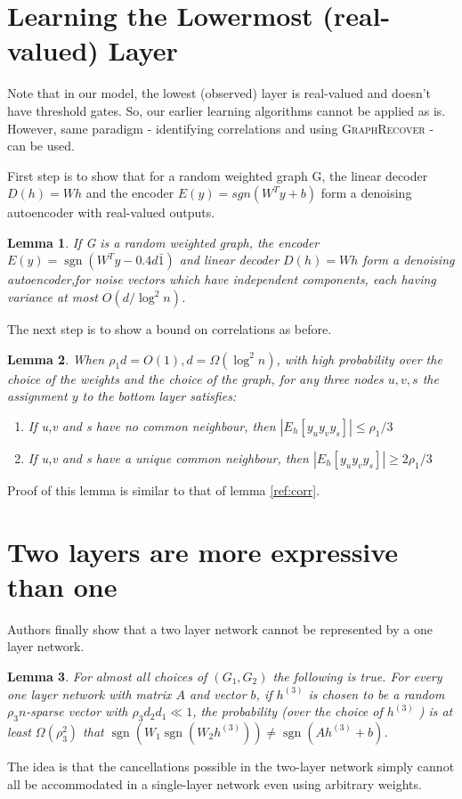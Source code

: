 \documentclass[11pt]{article}
\newcommand{\sgn}{\operatorname{sgn}}
\newtheorem{lemma}{Lemma}
\begin{document}
	\section{Learning the Lowermost (real-valued) Layer}
	Note that in our model, the lowest (observed) layer is real-valued and doesn't have threshold gates. So, our earlier learning algorithms cannot be applied as is. However, same paradigm - identifying correlations and using \textsc{GraphRecover} - can be used.
	
	First step is to show that for a random weighted graph G, the linear decoder $D(h) = Wh$ and the encoder $E(y) = sgn(W^T y + b)$ form a denoising autoencoder with real-valued outputs. 
	\begin{lemma}
	If G is a random weighted graph, the encoder $E(y)=\sgn(W^Ty - 0.4 d \bar{1})$ and linear decoder $D(h)= Wh$ form a denoising autoencoder,for noise vectors which have independent components, each having variance at most $O(d/ \log^2 n)$.
	\end{lemma}

	The next step is to show a bound on correlations as before.	
	\begin{lemma}
		When $\rho_1d = O(1), d = \Omega(\log^2 n)$, with high probability over the choice of the weights and the choice of the graph, for any three nodes $u, v, s$ the assignment $y$ to the bottom layer satisfies:
		\begin{enumerate}
		\item If u,v and s have no common neighbour, then $|E_h[y_uy_vy_s]| \leq \rho_1/3$
		\item If u,v and s have a unique common neighbour, then $|E_h[y_uy_vy_s]| \geq 2\rho_1/3$
		\end{enumerate}
	\end{lemma}
	Proof of this lemma is similar to that of lemma \ref{ref:corr}.
	\section{Two layers are more expressive than one}
	Authors finally show that a two layer network cannot be represented by a one layer network.
	\begin{lemma} 
	For almost all choices of $(G_1 , G_2 )$ the following is true. For every one layer network with matrix $A$ and vector $b$, if $h^{(3)}$ is chosen to be a random $\rho_3n$-sparse vector with $\rho_3d_2d_1 \ll 1$, the probability (over the choice of $h^{(3)}$ ) is at least $\Omega(\rho_3^2)$ that $\sgn(W_1 \sgn(W_2h^{(3)})) \not= \sgn(Ah^{(3)} + b)$.
	\end{lemma}
	The idea is that the cancellations possible in the two-layer network simply cannot all be accommodated in a single-layer network even using arbitrary weights.
	
\end{document}
